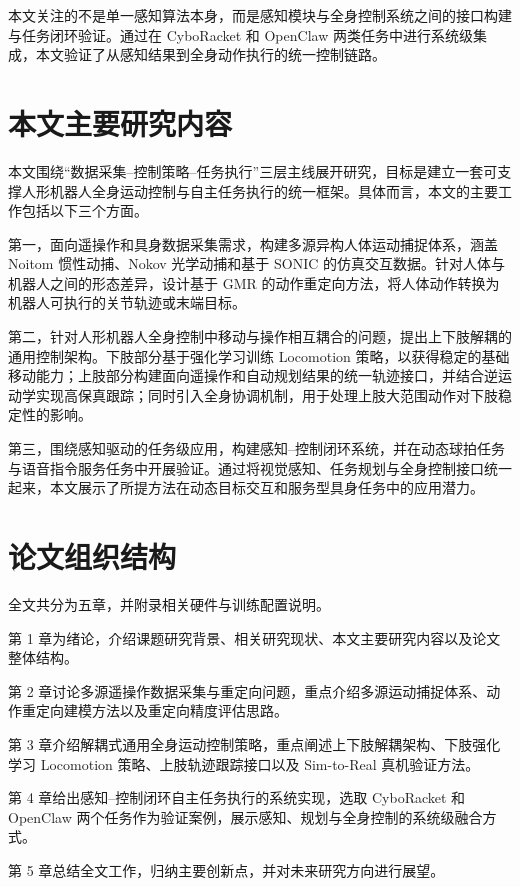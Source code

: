 本文关注的不是单一感知算法本身，而是感知模块与全身控制系统之间的接口构建与任务闭环验证。通过在 CyboRacket 和 OpenClaw 两类任务中进行系统级集成，本文验证了从感知结果到全身动作执行的统一控制链路。

\section{本文主要研究内容}

本文围绕“数据采集--控制策略--任务执行”三层主线展开研究，目标是建立一套可支撑人形机器人全身运动控制与自主任务执行的统一框架。具体而言，本文的主要工作包括以下三个方面。

第一，面向遥操作和具身数据采集需求，构建多源异构人体运动捕捉体系，涵盖 Noitom 惯性动捕、Nokov 光学动捕和基于 SONIC 的仿真交互数据。针对人体与机器人之间的形态差异，设计基于 GMR 的动作重定向方法，将人体动作转换为机器人可执行的关节轨迹或末端目标。

第二，针对人形机器人全身控制中移动与操作相互耦合的问题，提出上下肢解耦的通用控制架构。下肢部分基于强化学习训练 Locomotion 策略，以获得稳定的基础移动能力；上肢部分构建面向遥操作和自动规划结果的统一轨迹接口，并结合逆运动学实现高保真跟踪；同时引入全身协调机制，用于处理上肢大范围动作对下肢稳定性的影响。

第三，围绕感知驱动的任务级应用，构建感知--控制闭环系统，并在动态球拍任务与语音指令服务任务中开展验证。通过将视觉感知、任务规划与全身控制接口统一起来，本文展示了所提方法在动态目标交互和服务型具身任务中的应用潜力。

\section{论文组织结构}

全文共分为五章，并附录相关硬件与训练配置说明。

第 1 章为绪论，介绍课题研究背景、相关研究现状、本文主要研究内容以及论文整体结构。

第 2 章讨论多源遥操作数据采集与重定向问题，重点介绍多源运动捕捉体系、动作重定向建模方法以及重定向精度评估思路。

第 3 章介绍解耦式通用全身运动控制策略，重点阐述上下肢解耦架构、下肢强化学习 Locomotion 策略、上肢轨迹跟踪接口以及 Sim-to-Real 真机验证方法。

第 4 章给出感知--控制闭环自主任务执行的系统实现，选取 CyboRacket 和 OpenClaw 两个任务作为验证案例，展示感知、规划与全身控制的系统级融合方式。

第 5 章总结全文工作，归纳主要创新点，并对未来研究方向进行展望。
